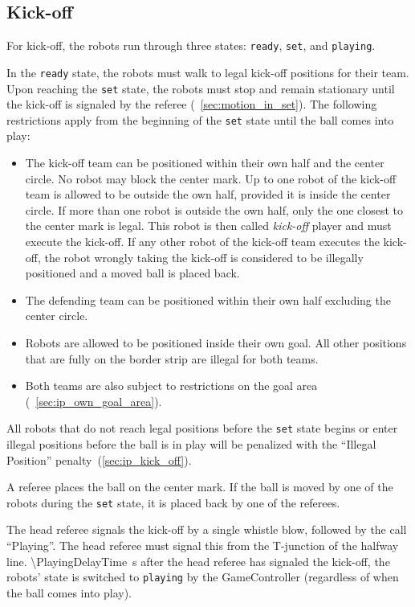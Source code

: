 \subsection{Kick-off}
\label{sec:kick-off}

For kick-off, the robots run through three states: \texttt{ready}, \texttt{set}, and \texttt{playing}.

In the \texttt{ready} state, the robots must walk to legal kick-off positions for their team.
Upon reaching the \texttt{set} state, the robots must stop and remain stationary until the kick-off is signaled by the referee (\cf~\cref{sec:motion_in_set}).
The following restrictions apply from the beginning of the \texttt{set} state until the ball comes into play:
\begin{itemize}
  \item The kick-off team can be positioned within their own half and the center circle.
    No robot may block the center mark.
    Up to one robot of the kick-off team is allowed to be outside the own half, provided it is inside the center circle.
    If more than one robot is outside the own half, only the one closest to the center mark is legal.
    This robot is then called \emph{kick-off} player and must execute the kick-off.
    If any other robot of the kick-off team executes the kick-off, the robot wrongly taking the kick-off is considered to be illegally positioned and a moved ball is placed back.
  \item The defending team can be positioned within their own half excluding the center circle.
  \item Robots are allowed to be positioned inside their own goal.
    All other positions that are fully on the border strip are illegal for both teams.
  \item Both teams are also subject to restrictions on the goal area (\cf~\cref{sec:ip_own_goal_area}).
\end{itemize}
All robots that do not reach legal positions before the \texttt{set} state begins or enter illegal positions before the ball is in play will be penalized with the ``Illegal Position'' penalty~(\cf \cref{sec:ip_kick_off}).

A referee places the ball on the center mark.
If the ball is moved by one of the robots during the \texttt{set} state, it is placed back by one of the referees.

The head referee signals the kick-off by a single whistle blow, followed by the call ``Playing''.
The head referee must signal this from the T-junction of the halfway line.
\qty{\PlayingDelayTime}{\second} after the head referee has signaled the kick-off, the robots' state is switched to \texttt{playing} by the GameController (regardless of when the ball comes into play).

